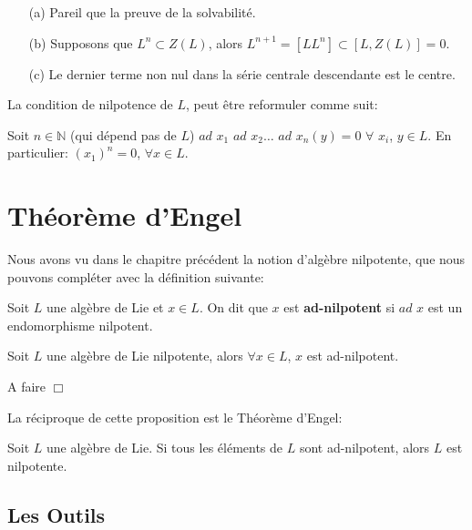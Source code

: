 \documentclass[a4paper,openany,12pt]{report}
\newcommand{\NN}{\mathbb{N}}
\theoremstyle{break}
{\theorembodyfont{\upshape}
\newtheorem*{rmq}{Remarque :}
\newtheorem*{prv}{Preuve :}
\newtheorem*{ex}{Exemples :}
\newtheorem{exe}{Exemple : }
\newtheorem*{nota}{Notation :}}
\begin{document}
\begin{prv}
\begin{itemize}
\item[(a)]  Pareil que la preuve de la solvabilité.
\item[(b)]  Supposons que $L^n\subset Z(L)$, alors $L^{n+1}=[LL^n]\subset [L,Z(L)]=0$.
\item[(c)] Le dernier terme non nul dans la série centrale descendante est le centre.
\end{itemize}
\end{prv}

\begin{rmq}
La condition de nilpotence de $L$, peut être reformuler comme suit:

Soit $n\in\NN$ (qui dépend pas de $L$) $ad$ $x_{1}$ $ad$ $x_{2} \ldots$ $ad$ $x_{n}(y)=0$  $\forall$ $x_{i}$, $y \in L$.
En particulier:
$(x_{1})^n=0$, $\forall x \in L$.
\end{rmq}

\chapter{Théorème d'Engel}

\quad Nous avons vu dans le chapitre précédent la notion d'algèbre nilpotente, que nous pouvons compléter avec la définition suivante:

\begin{df}
\quad Soit $L$ une algèbre de Lie et $x \in L$. On dit que $x$ est \textbf{ad-nilpotent} si $ad$ $x$ est un endomorphisme nilpotent. 
\end{df}

\begin{prop}\label{prop:E1}
\quad Soit $L$ une algèbre de Lie nilpotente, alors $\forall x \in L$, $x$ est ad-nilpotent.
\end{prop}

\begin{prv}
A faire $\Box$
\end{prv}

La réciproque de cette proposition est le Théorème d'Engel:

\begin{thm}\label{thm:engel}
\quad Soit $L$ une algèbre de Lie.
Si tous les éléments de $L$ sont ad-nilpotent, alors $L$ est nilpotente.
\end{thm}

\section{Les Outils}
\end{document}
